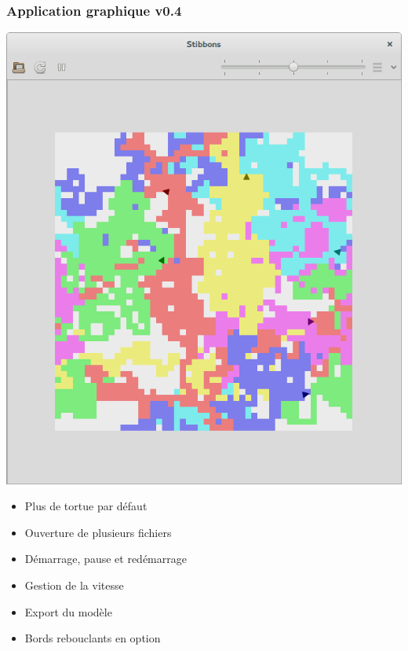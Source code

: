 \begin{frame}
\frametitle{Application graphique v0.4}
\begin{center}
\includegraphics[scale=0.16]{doc/Presentation/screenshot/stibbons-0-4-2.png}
\end{center}

\begin{itemize}
	\item Plus de tortue par défaut
	\item Ouverture de plusieurs fichiers
	\item Démarrage, pause et redémarrage
	\item Gestion de la vitesse
	\item Export du modèle
	\item Bords rebouclants en option
\end{itemize}
\end{frame}

